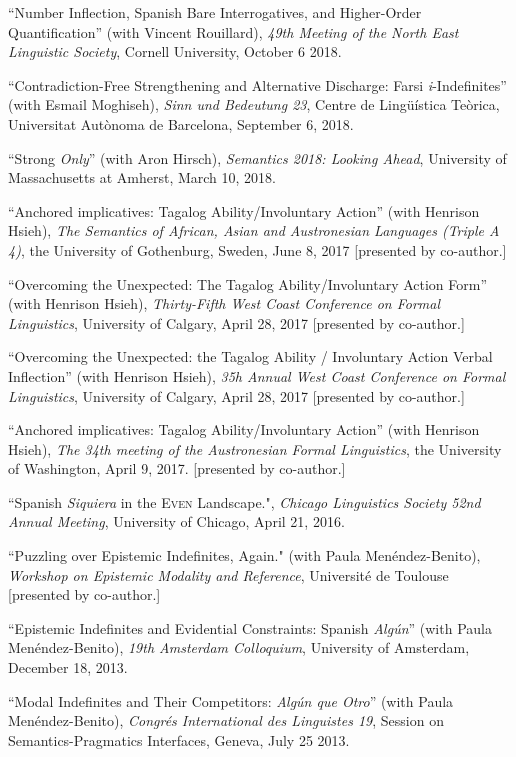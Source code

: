 \documentclass[11pt]{article}
\begin{document}
``Number Inflection, Spanish Bare Interrogatives, and Higher-Order Quantification'' (with Vincent Rouillard), \textit{49th
  Meeting of the North East Linguistic Society}, Cornell University, October 6 2018.

``Contradiction-Free Strengthening and Alternative Discharge: Farsi \textit{i}-Indefinites'' (with Esmail Moghiseh), \textit{Sinn und Bedeutung 23}, Centre de Ling\"{u}\'istica Te\`orica, Universitat Aut\`onoma de Barcelona, September 6, 2018.
 
``Strong \textit{Only}'' (with Aron Hirsch), \textit{Semantics 2018: Looking Ahead}, University of Massachusetts at Amherst, March 10, 2018.
 

``Anchored implicatives: Tagalog Ability/Involuntary Action'' (with Henrison Hsieh), \textit{The Semantics of African, Asian and Austronesian Languages (Triple A 4)}, the University of Gothenburg, Sweden, June 8, 2017 [presented by co-author.]

``Overcoming the Unexpected: The Tagalog Ability/Involuntary Action Form'' (with Henrison Hsieh),  \textit{Thirty-Fifth West Coast Conference on Formal Linguistics}, University of Calgary, April 28, 2017 [presented by co-author.]

``Overcoming the Unexpected: the Tagalog Ability / Involuntary Action Verbal Inflection'' (with Henrison Hsieh), \textit{35h Annual West Coast Conference on Formal Linguistics}, University of Calgary, April 28, 2017 [presented by co-author.]

``Anchored implicatives: Tagalog Ability/Involuntary Action'' (with Henrison Hsieh), \textit{The 34th meeting of the Austronesian Formal Linguistics}, the University of Washington, April 9, 2017. [presented by co-author.]

``Spanish \textit{Siquiera} in the \textsc{Even} Landscape.", \textit{Chicago Linguistics Society 52nd Annual Meeting}, University of Chicago, April 21, 2016. 

``Puzzling over Epistemic Indefinites, Again." (with Paula
Men\'endez-Benito), \textit{Workshop on Epistemic Modality and Reference}, Universit\'e de Toulouse [presented by co-author.]

``Epistemic Indefinites and Evidential Constraints:
Spanish \textit{Alg\'un}''  (with Paula
Men\'endez-Benito), \textit{19th Amsterdam Colloquium}, University of Amsterdam,
December 18, 2013.

``Modal Indefinites and Their Competitors: \textit{Alg\'un
  que Otro}'' (with Paula
Men\'endez-Benito), \textit{Congr\'es International des Linguistes 19},
Session on Semantics-Pragmatics Interfaces, Geneva, July 25 2013.
\end{document}
